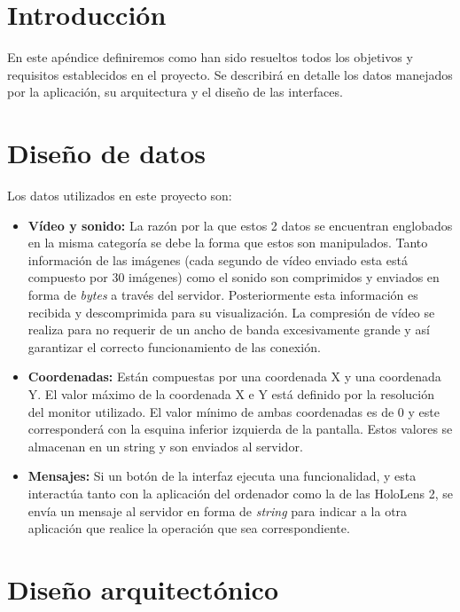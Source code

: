 
\section{Introducción}

En este apéndice definiremos como han sido resueltos todos los objetivos y requisitos establecidos en el proyecto. Se describirá en detalle los datos manejados por la aplicación, su arquitectura y el diseño de las interfaces.

\section{Diseño de datos}

Los datos utilizados en este proyecto son:
\begin{itemize}
    \item \textbf{Vídeo y sonido:} La razón por la que estos 2 datos se encuentran englobados en la misma categoría se debe la forma que estos son manipulados. Tanto información de las imágenes (cada segundo de vídeo enviado esta está compuesto por 30 imágenes) como el sonido son comprimidos y enviados en forma de \textit{bytes} a través del servidor. Posteriormente esta información es recibida y descomprimida para su visualización. La compresión de vídeo se realiza para no requerir de un ancho de banda excesivamente grande  y así garantizar el correcto funcionamiento de las conexión.
    \item \textbf{Coordenadas:} Están compuestas por una coordenada X y una coordenada Y. El valor máximo de la coordenada X e Y está definido por la resolución del monitor utilizado. El valor mínimo de ambas coordenadas es de 0 y este corresponderá con la esquina inferior izquierda de la pantalla. Estos valores se almacenan en un string y son enviados al servidor.  
    \item \textbf{Mensajes:} Si un botón de la interfaz ejecuta una funcionalidad, y esta interactúa tanto con la aplicación del ordenador como la de las HoloLens 2, se envía un mensaje al servidor en forma de \textit{string} para indicar a la otra aplicación que realice la operación que sea correspondiente.
\end{itemize}


\section{Diseño arquitectónico}

